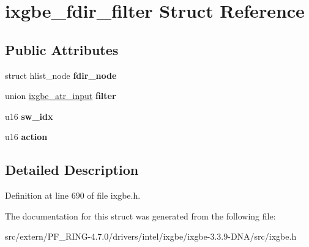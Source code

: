 \hypertarget{structixgbe__fdir__filter}{
\section{ixgbe\_\-fdir\_\-filter Struct Reference}
\label{structixgbe__fdir__filter}
}
\subsection*{Public Attributes}
\begin{DoxyCompactItemize}
\item 
\hypertarget{structixgbe__fdir__filter_a564d8e3c10512c5b5ca36474fc3f4bf5}{
struct hlist\_\-node {\bfseries fdir\_\-node}}
\label{structixgbe__fdir__filter_a564d8e3c10512c5b5ca36474fc3f4bf5}

\item 
\hypertarget{structixgbe__fdir__filter_a0dd5958d4dd5f1393519886f8136ec54}{
union \hyperlink{unionixgbe__atr__input}{ixgbe\_\-atr\_\-input} {\bfseries filter}}
\label{structixgbe__fdir__filter_a0dd5958d4dd5f1393519886f8136ec54}

\item 
\hypertarget{structixgbe__fdir__filter_a7a537796ba47167ea4d5087aecbc2560}{
u16 {\bfseries sw\_\-idx}}
\label{structixgbe__fdir__filter_a7a537796ba47167ea4d5087aecbc2560}

\item 
\hypertarget{structixgbe__fdir__filter_a23a11f24119e9dd8a7d8bcac1144883d}{
u16 {\bfseries action}}
\label{structixgbe__fdir__filter_a23a11f24119e9dd8a7d8bcac1144883d}

\end{DoxyCompactItemize}


\subsection{Detailed Description}


Definition at line 690 of file ixgbe.h.



The documentation for this struct was generated from the following file:\begin{DoxyCompactItemize}
\item 
src/extern/PF\_\-RING-\/4.7.0/drivers/intel/ixgbe/ixgbe-\/3.3.9-\/DNA/src/ixgbe.h\end{DoxyCompactItemize}
